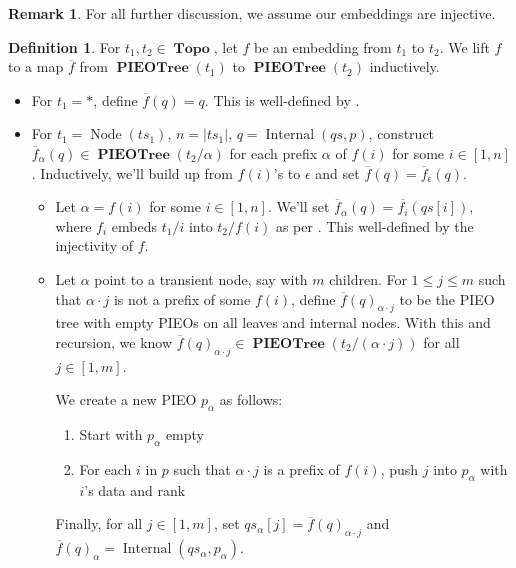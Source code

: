 \documentclass{amsart}
\DeclareMathOperator{\Topo}{\mathbf{Topo}}
\DeclareMathOperator{\PIEOTree}{\mathbf{PIEOTree}}
\DeclareMathOperator{\Internal}{\mathrm{Internal}}
\DeclareMathOperator{\Node}{\mathrm{Node}}
\theoremstyle{definition}
\newtheorem{dfn}[thm]{Definition}
\newtheorem{rem}[thm]{Remark}
\begin{document}
\begin{rem}
    For all further discussion, we assume our embeddings are injective.
\end{rem}

\begin{dfn}
    \label{dfn:f_bar}
    For $t_1, t_2 \in \Topo$, let $f$ be an embedding from $t_1$ to $t_2$.
    We lift $f$ to a map $\overline{f}$ from $\PIEOTree(t_1)$ to $\PIEOTree(t_2)$ inductively.
    \begin{itemize}
        \item For $t_1 = \ast$, define $\overline{f}(q) = q$. This is well-defined by \cite[Lemma ~5.2]{OG}.
        \item For $t_1 = \Node(ts_1)$, $n = |ts_1|$, $q = \Internal(qs, p)$, 
            construct $\overline{f}_{\alpha}(q) \in \PIEOTree(t_2/\alpha)$ for each prefix $\alpha$ of $f(i)$ for some $i \in [1,n]$.
            Inductively, we'll build up from $f(i)$'s to $\epsilon$ and set $\overline{f}(q) = \overline{f}_\epsilon(q)$.
            \begin{itemize}
                \item Let $\alpha = f(i)$ for some $i \in [1,n]$. We'll set $\overline{f}_\alpha(q) = \overline{f_i}(qs[i])$, 
                    where $f_i$ embeds $t_1/i$ into $t_2/f(i)$ as per \cite[Lemma 5.2]{OG}.
                    This well-defined by the injectivity of $f$.
                \item Let $\alpha$ point to a transient node, say with $m$ children.
                    For $1 \leq j \leq m$ such that $\alpha \cdot j$ is not a prefix of some $f(i)$, 
                    define $\overline{f}(q)_{\alpha \cdot j}$ to be the PIEO tree with empty PIEOs on all leaves and internal nodes. 
                    With this and recursion, we know $\overline{f}(q)_{\alpha \cdot j} \in \PIEOTree(t_2/(\alpha \cdot j))$ for all $j \in [1, m]$.

                    We create a new PIEO $p_\alpha$ as follows:
                    \begin{enumerate} 
                        \item Start with $p_\alpha$ empty
                        \item For each $i$ in $p$ such that $\alpha \cdot j$ is a prefix of $f(i)$, push $j$ into $p_\alpha$ with $i$'s data and rank
                    \end{enumerate}

                    Finally, for all $j \in [1,m]$, set $qs_\alpha[j] = \overline{f}(q)_{\alpha \cdot j}$ and $\overline{f}(q)_\alpha = \Internal(qs_\alpha, p_\alpha)$.
            \end{itemize}
    \end{itemize}
\end{dfn}
\end{document}
